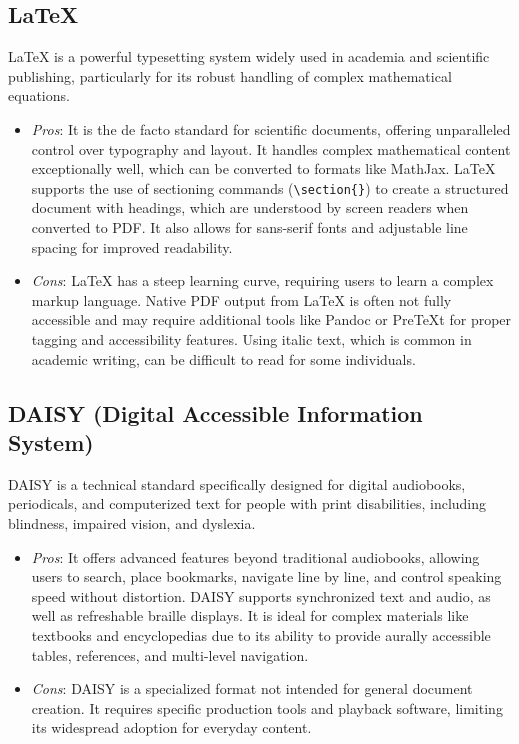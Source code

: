 \subsection{LaTeX}
LaTeX is a powerful typesetting system widely used in academia and scientific publishing, particularly for its robust handling of complex mathematical equations. \supercite{CreateUW}
\begin{itemize}
	\item \emph{Pros}: It is the de facto standard for scientific documents, offering unparalleled control over typography and layout. It handles complex mathematical content exceptionally well, which can be converted to  formats like MathJax. \supercite{CreateUW, LaTeXAccessibility} LaTeX supports the use of sectioning commands (\texttt{\textbackslash section\{\}}) to create a structured document with headings, which are understood by screen readers when converted to PDF. \supercite{LancasterLatex} It also allows for sans-serif fonts and adjustable line spacing for improved readability. \supercite{LancasterLatex}
	\item \emph{Cons}: LaTeX has a steep learning curve, requiring users to learn a complex markup language. Native PDF output from LaTeX is often not fully accessible and may require additional tools like Pandoc or PreTeXt for proper tagging and accessibility features. \supercite{CreateUW, LaTeXAccessibility} Using italic text, which is common in academic writing, can be difficult to read for some individuals. \supercite{LancasterLatex}
\end{itemize}

\subsection{DAISY (Digital Accessible Information System)}
DAISY is a technical standard specifically designed for digital audiobooks, periodicals, and computerized text for people with print disabilities, including blindness, impaired vision, and dyslexia. \supercite{DAISYWiki}
\begin{itemize}
	\item \emph{Pros}: It offers advanced  features beyond traditional audiobooks, allowing users to search, place bookmarks, navigate line by line, and control speaking speed without distortion. \supercite{DAISYWiki, SnowDAISY} DAISY supports synchronized text and audio, as well as refreshable braille displays. \supercite{DAISYWiki, SnowDAISY} It is ideal for complex materials like textbooks and encyclopedias due to its ability to provide aurally accessible tables, references, and multi-level navigation. \supercite{DAISYWiki}
	\item \emph{Cons}: DAISY is a specialized format not intended for general document creation. It requires specific production tools and playback software, limiting its widespread adoption for everyday content. \supercite{DAISYWiki, SnowDAISY}
\end{itemize}

